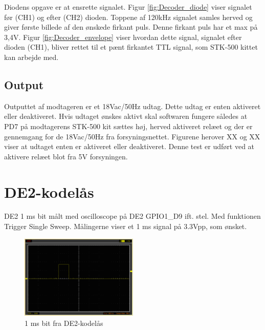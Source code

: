 Diodens opgave er at ensrette signalet. Figur \ref{fig:Decoder_diode} viser signalet før (CH1) og efter (CH2) dioden. Toppene af 120kHz signalet samles herved og giver første billede af den ønskede firkant puls. Denne firkant puls har et max på 3,4V. Figur \ref{fig:Decoder_envelope} viser hvordan dette signal, signalet efter dioden (CH1), bliver rettet til et pænt firkantet TTL signal, som STK-500 kittet kan arbejde med. 
  

\subsection{Output}



Outputtet af modtageren er et 18Vac/50Hz udtag. Dette udtag er enten aktiveret eller deaktiveret. Hvis udtaget ønskes aktivt skal softwaren fungere således at PD7 på modtagerens STK-500 kit sættes høj, herved aktiveret relæet og der er gennemgang for de 18Vac/50Hz fra forsyningsnettet. Figurene herover XX og XX viser at udtaget enten er aktiveret eller deaktiveret. Denne test er udført ved at aktivere relæet blot fra 5V forsyningen.   

\section{DE2-kodelås}

DE2 1 ms bit målt med oscilloscope på DE2 GPIO1\_D9 ift. stel. Med funktionen Trigger Single Sweep. Målingerne viser et 1 ms signal på 3.3Vpp, som ønsket.

\begin{figure}[H]
	\centering
	\includegraphics[width=0.50\textwidth]{billeder/HWTest/DE2/DE2_1ms_pulse}
	\caption{1 ms bit fra DE2-kodelås}
	\label{code:de2_test}
\end{figure}

\clearpage